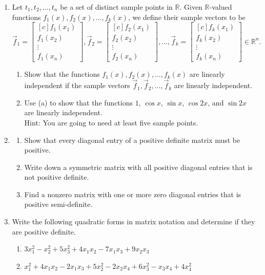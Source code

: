 \documentclass[12pt]{article}
\begin{document}
\begin{enumerate}
	\item Let $t_1,t_2,\dots,t_n$ be a set of distinct sample points in $\mathbb{R}$. Given $\mathbb{R}$-valued functions $f_1(x), f_2(x),\dots,f_k(x)$, we define their sample vectors to be
		\[
			\vec{f}_1=\begin{bmatrix*}[c]f_1(x_1)\\f_1(x_2)\\ \vdots\\f_1(x_n)\end{bmatrix*},
			\vec{f}_2=\begin{bmatrix*}[c]f_2(x_1)\\f_2(x_2)\\ \vdots\\f_2(x_n)\end{bmatrix*}, \dots,
			\vec{f}_k=\begin{bmatrix*}[c]f_k(x_1)\\f_k(x_2)\\ \vdots\\f_k(x_n)\end{bmatrix*}\in\mathbb{R}^n.
		\]
		\begin{enumerate}
			\item Show that the functions $f_1(x),f_2(x),\dots,f_k(x)$ are linearly independent if the sample vectors $\vec{f}_1,\vec{f}_2,\dots,\vec{f}_k$ are linearly independent. 
			\item Use (a) to show that the functions $1$, $\cos x$, $\sin x$, $\cos 2x$, and $\sin 2x$ are linearly independent. \\ Hint: You are going to need at least five sample points. 
		\end{enumerate}

	\bigskip

	\item 
		\begin{enumerate}
			\item Show that every diagonal entry of a positive definite matrix must be positive. 
			\item Write down a symmetric matrix with all positive diagonal entries that is not positive definite. 
			\item Find a nonzero matrix with one or more zero diagonal entries that is positive semi-definite. 
		\end{enumerate}
		
	\bigskip
	
	\item Write the following quadratic forms in matrix notation and determine if they are positive definite. 
		\begin{enumerate}
			\item $3x_1^2-x_2^2+5x_3^2+4x_1x_2-7x_1x_3+9x_2x_3$
			\item $x_1^2+4x_1x_2-2x_1x_3+5x_2^2-2x_2x_4+6x_3^2-x_3x_4+4x_4^2$
		\end{enumerate}
		

\end{enumerate}
\end{document}
